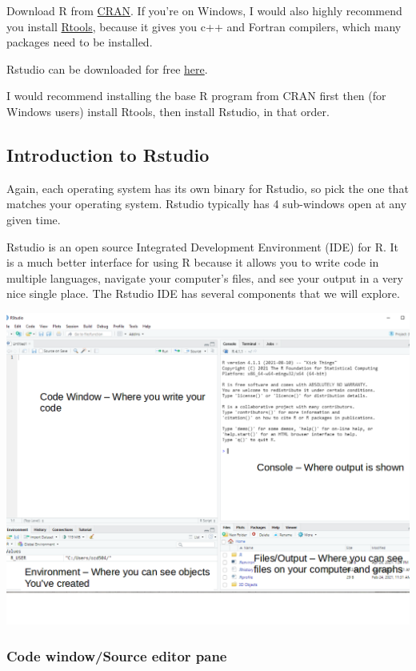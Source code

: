 \documentclass[
]{article}
\begin{document}
Download R from \href{https://cran.r-project.org/}{CRAN}. If you're on
Windows, I would also highly recommend you install
\href{https://cran.r-project.org/}{Rtools}, because it gives you c++ and
Fortran compilers, which many packages need to be installed.

Rstudio can be downloaded for free
\href{https://rstudio.com/products/rstudio/download/}{here}.

I would recommend installing the base R program from CRAN first then
(for Windows users) install Rtools, then install Rstudio, in that order.

\hypertarget{introduction-to-rstudio}{%
\subsection{Introduction to Rstudio}\label{introduction-to-rstudio}}

Again, each operating system has its own binary for Rstudio, so pick the one that matches your operating system. Rstudio typically has 4 sub-windows open at any given time.

Rstudio is an open source Integrated Development Environment (IDE) for R. It is a much better interface for using R because it allows you to write code in multiple languages, navigate your computer's files, and see your output in a very nice single place. The Rstudio IDE has several components that we will explore.

\includegraphics{./images/rstudio.png}

\hypertarget{code-windowsource-editor-pane}{%
\subsubsection{Code window/Source editor pane}\label{code-windowsource-editor-pane}}
\end{document}
